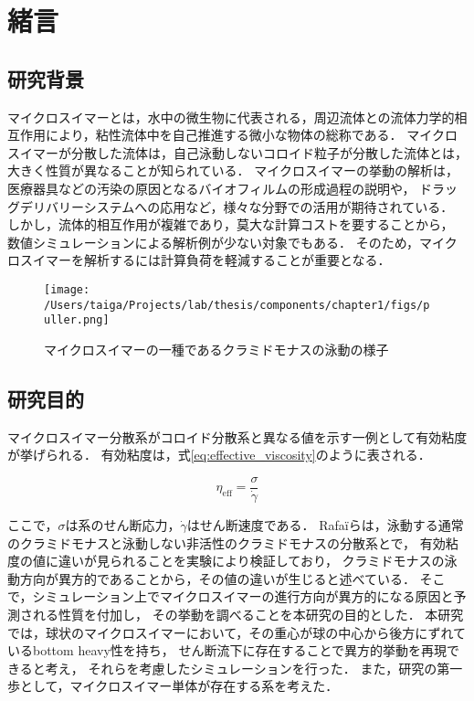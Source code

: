 \documentclass[11pt, a4j, dvipdfmx]{jarticle}
\begin{document}
\section{緒言}
\label{sec:introduction}


\subsection{研究背景}
\par
マイクロスイマーとは，水中の微生物に代表される，周辺流体との流体力学的相互作用により，粘性流体中を自己推進する微小な物体の総称である．
マイクロスイマーが分散した流体は，自己泳動しないコロイド粒子が分散した流体とは，大きく性質が異なることが知られている．
マイクロスイマーの挙動の解析は，医療器具などの汚染の原因となるバイオフィルムの形成過程の説明や，
ドラッグデリバリーシステムへの応用など，様々な分野での活用が期待されている．
しかし，流体的相互作用が複雑であり，莫大な計算コストを要することから，
数値シミュレーションによる解析例が少ない対象でもある．
そのため，マイクロスイマーを解析するには計算負荷を軽減することが重要となる．

    \begin{figure}[htbp]
        \centering
        \texttt{[image: /Users/taiga/Projects/lab/thesis/components/chapter1/figs/puller.png]}
        \caption{マイクロスイマーの一種であるクラミドモナスの泳動の様子\cite{Chlamydomonas}}
    \end{figure}


\subsection{研究目的}
\label{sec:purpose}

\par
マイクロスイマー分散系がコロイド分散系と異なる値を示す一例として有効粘度が挙げられる．
有効粘度は，式\eqref{eq:effective_viscosity}のように表される．

    \begin{equation}
        \eta_\mathrm{eff} = \frac{\sigma}{\dot{\gamma}}
        \label{eq:effective_viscosity}
    \end{equation}

\noindent
ここで，$\sigma$は系のせん断応力，$\dot{\gamma}$はせん断速度である．
Rafa\"iらは，泳動する通常のクラミドモナスと泳動しない非活性のクラミドモナスの分散系とで，
有効粘度の値に違いが見られることを実験により検証しており，
クラミドモナスの泳動方向が異方的であることから，その値の違いが生じると述べている\cite{effective_viscosity}．
そこで，シミュレーション上でマイクロスイマーの進行方向が異方的になる原因と予測される性質を付加し，
その挙動を調べることを本研究の目的とした．
本研究では，球状のマイクロスイマーにおいて，その重心が球の中心から後方にずれているbottom heavy性を持ち，
せん断流下に存在することで異方的挙動を再現できると考え，
それらを考慮したシミュレーションを行った．
また，研究の第一歩として，マイクロスイマー単体が存在する系を考えた．
\end{document}
